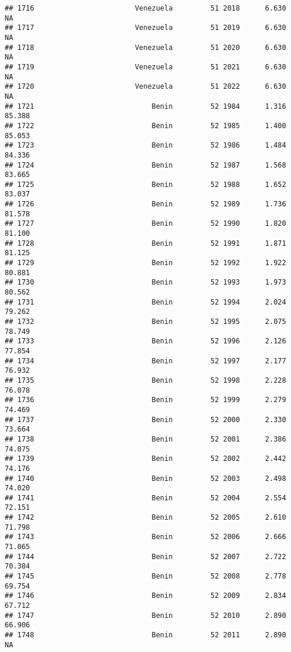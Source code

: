 \documentclass[
]{article}
\begin{document}
\begin{verbatim}
## 1716                        Venezuela         51 2018      6.630         NA
## 1717                        Venezuela         51 2019      6.630         NA
## 1718                        Venezuela         51 2020      6.630         NA
## 1719                        Venezuela         51 2021      6.630         NA
## 1720                        Venezuela         51 2022      6.630         NA
## 1721                            Benin         52 1984      1.316     85.388
## 1722                            Benin         52 1985      1.400     85.053
## 1723                            Benin         52 1986      1.484     84.336
## 1724                            Benin         52 1987      1.568     83.665
## 1725                            Benin         52 1988      1.652     83.037
## 1726                            Benin         52 1989      1.736     81.578
## 1727                            Benin         52 1990      1.820     81.100
## 1728                            Benin         52 1991      1.871     81.125
## 1729                            Benin         52 1992      1.922     80.881
## 1730                            Benin         52 1993      1.973     80.562
## 1731                            Benin         52 1994      2.024     79.262
## 1732                            Benin         52 1995      2.075     78.749
## 1733                            Benin         52 1996      2.126     77.854
## 1734                            Benin         52 1997      2.177     76.932
## 1735                            Benin         52 1998      2.228     76.078
## 1736                            Benin         52 1999      2.279     74.469
## 1737                            Benin         52 2000      2.330     73.664
## 1738                            Benin         52 2001      2.386     74.075
## 1739                            Benin         52 2002      2.442     74.176
## 1740                            Benin         52 2003      2.498     74.020
## 1741                            Benin         52 2004      2.554     72.151
## 1742                            Benin         52 2005      2.610     71.798
## 1743                            Benin         52 2006      2.666     71.065
## 1744                            Benin         52 2007      2.722     70.384
## 1745                            Benin         52 2008      2.778     69.754
## 1746                            Benin         52 2009      2.834     67.712
## 1747                            Benin         52 2010      2.890     66.906
## 1748                            Benin         52 2011      2.890         NA

\end{verbatim}
\end{document}
